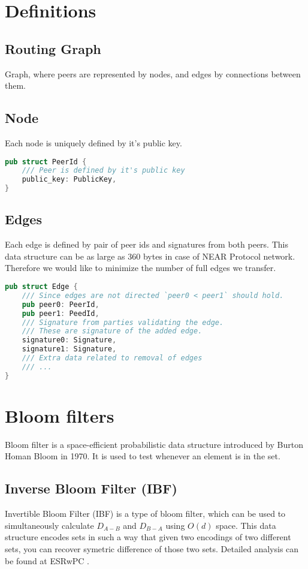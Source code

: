 \documentclass[11pt]{article}
\begin{document}
\section{Definitions}
\subsection{Routing Graph}
Graph, where peers are represented by nodes, and edges by connections between them.
\subsection{Node}
Each node is uniquely defined by it's public key.
\begin{lstlisting}[language=Rust]
pub struct PeerId {
    /// Peer is defined by it's public key
    public_key: PublicKey,
}
\end{lstlisting}
\subsection{Edges}
Each edge is defined by pair of peer ids and signatures from both peers.
This data structure can be as large as 360 bytes in case of NEAR Protocol network.
Therefore we would like to minimize the number of full edges we transfer.
\begin{lstlisting}[language=Rust]
pub struct Edge {
    /// Since edges are not directed `peer0 < peer1` should hold.
    pub peer0: PeerId,
    pub peer1: PeedId,
    /// Signature from parties validating the edge.
    /// These are signature of the added edge.
    signature0: Signature,
    signature1: Signature,
    /// Extra data related to removal of edges
    /// ...
}
\end{lstlisting}

\section{Bloom filters}
Bloom filter is a space-efficient probabilistic data structure introduced by Burton Homan Bloom \cite{bhb} in 1970.
It is used to test whenever an element is in the set.
\subsection{Inverse Bloom Filter (IBF)}
Invertible Bloom Filter (IBF) is a type of bloom filter, which can be used to simultaneously calculate  $D_{A-B}$ and $D_{B-A}$ using $O(d)$ space.
This data structure encodes sets in such a way that given two encodings  of two different sets, you can recover symetric difference of those two sets.
Detailed analysis can be found at ESRwPC \cite{esrwpc}.
\end{document}
